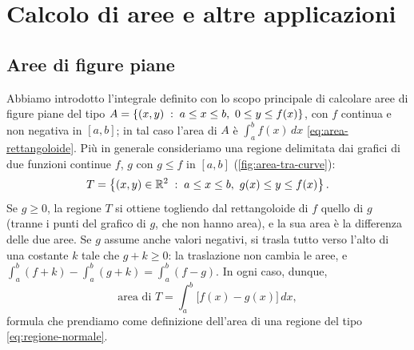 \section{Calcolo di aree e altre applicazioni}
\label{sec:applicazioni-integrali}

\subsection{Aree di figure piane}

Abbiamo introdotto l'integrale definito con lo scopo principale di calcolare aree di
figure piane del tipo $A=\left\{ (x,y) \;:\; a\le x\le b,\ 0\le y\le f(x) \right\}$, con $f$ continua e non
negativa in $[a,b]$; in tal caso l'area di $A$ è $\int_{a}^{b}f(x)\,dx$
\eqref{eq:area-rettangoloide}. Più in generale consideriamo una regione delimitata dai
grafici di due funzioni continue $f$, $g$ con $g\le f$ in $[a,b]$ (\cref{fig:area-tra-curve}):
\begin{equation}\label{eq:regione-normale}
  T=\left\{ (x,y)\in\mathbb{R}^{2} \;:\; a\le x\le b,\ g(x)\le y\le f(x) \right\} .
\end{equation}
Se $g\ge0$, la regione $T$ si ottiene togliendo dal rettangoloide di $f$ quello di $g$
(tranne i punti del grafico di $g$, che non hanno area), e la sua area è la differenza
delle due aree. Se $g$ assume anche valori negativi, si trasla tutto verso l'alto di una
costante $k$ tale che $g+k\ge0$: la traslazione non cambia le aree, e
$\int_{a}^{b}(f+k)-\int_{a}^{b}(g+k)=\int_{a}^{b}(f-g)$. In ogni caso, dunque,
\begin{equation}\label{eq:area-tra-curve}
  \text{area di }T=\int_{a}^{b}\bigl[f(x)-g(x)\bigr]\,dx ,
\end{equation}
formula che prendiamo come definizione dell'area di una regione del tipo
\eqref{eq:regione-normale}.

